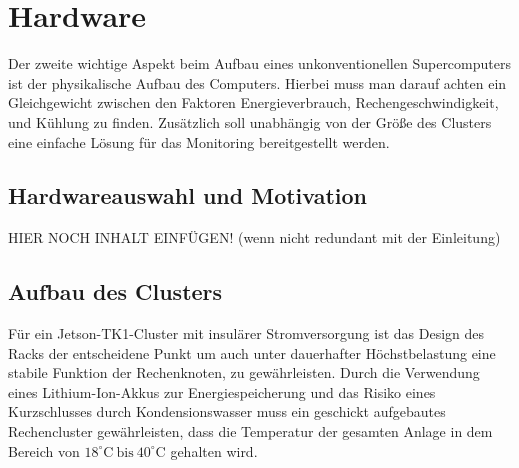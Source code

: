 \section{Hardware}
Der zweite wichtige Aspekt beim Aufbau eines unkonventionellen 
Supercomputers ist der physikalische Aufbau des Computers.
Hierbei muss man darauf achten ein Gleichgewicht zwischen den Faktoren 
Energieverbrauch, Rechengeschwindigkeit, und Kühlung zu finden.
Zusätzlich soll unabhängig von der Größe des Clusters eine
einfache Lösung für das Monitoring bereitgestellt werden.

\subsection{Hardwareauswahl und Motivation}
HIER NOCH INHALT EINFÜGEN! (wenn nicht redundant mit der Einleitung)


\subsection{Aufbau des Clusters}
Für ein Jetson-TK1-Cluster mit insulärer Stromversorgung
ist das Design des Racks der entscheidene Punkt um 
auch unter dauerhafter Höchstbelastung eine
stabile Funktion der Rechenknoten, zu gewährleisten.
Durch die Verwendung eines Lithium-Ion-Akkus zur Energiespeicherung
und das Risiko eines Kurzschlusses durch Kondensionswasser muss
ein geschickt aufgebautes Rechencluster gewährleisten, dass die Temperatur
der gesamten Anlage in dem Bereich von 
$18^\circ\text{C}~\text{bis}~40^\circ \text{C}$ gehalten wird. 
